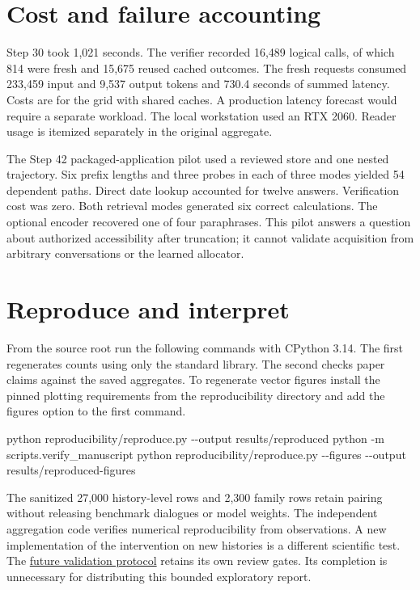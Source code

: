 \documentclass[
  11pt,
]{article}
\newenvironment{Shaded}{}{}
\newcommand{\NormalTok}[1]{#1}
\begin{document}
\section{Cost and failure accounting}\label{cost-and-failure-accounting}

Step 30 took 1,021 seconds. The verifier recorded 16,489 logical calls,
of which 814 were fresh and 15,675 reused cached outcomes. The fresh
requests consumed 233,459 input and 9,537 output tokens and 730.4
seconds of summed latency. Costs are for the grid with shared caches. A
production latency forecast would require a separate workload. The local
workstation used an RTX 2060. Reader usage is itemized separately in the
original aggregate.

The Step 42 packaged-application pilot used a reviewed store and one
nested trajectory. Six prefix lengths and three probes in each of three
modes yielded 54 dependent paths. Direct date lookup accounted for
twelve answers. Verification cost was zero. Both retrieval modes
generated six correct calculations. The optional encoder recovered one
of four paraphrases. This pilot answers a question about authorized
accessibility after truncation; it cannot validate acquisition from
arbitrary conversations or the learned allocator.

\section{Reproduce and interpret}\label{reproduce-and-interpret}

From the source root run the following commands with CPython 3.14. The
first regenerates counts using only the standard library. The second
checks paper claims against the saved aggregates. To regenerate vector
figures install the pinned plotting requirements from the
reproducibility directory and add the figures option to the first
command.

\begin{Shaded}
\begin{Highlighting}[]
\NormalTok{python reproducibility/reproduce.py {-}{-}output results/reproduced}
\NormalTok{python {-}m scripts.verify\_manuscript}
\NormalTok{python reproducibility/reproduce.py {-}{-}figures {-}{-}output results/reproduced{-}figures}
\end{Highlighting}
\end{Shaded}

The sanitized 27,000 history-level rows and 2,300 family rows retain
pairing without releasing benchmark dialogues or model weights. The
independent aggregation code verifies numerical reproducibility from
observations. A new implementation of the intervention on new histories
is a different scientific test. The
\href{../validation_protocol_v2.md}{future validation protocol} retains
its own review gates. Its completion is unnecessary for distributing
this bounded exploratory report.
\end{document}
